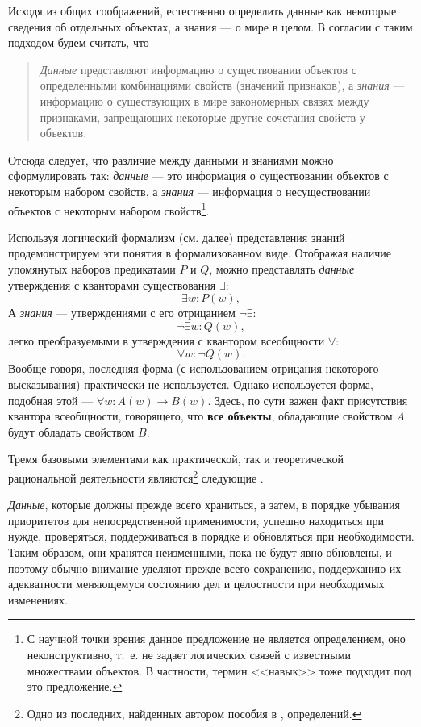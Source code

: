 \documentclass[12pt, openany, twoside]{book} %
\begin{document}
Исходя из общих соображений, естественно определить данные как некоторые сведения об отдельных объектах, а знания --- о мире в целом. В согласии с таким подходом будем считать, что
\begin{quote}
{\em Данные} представляют информацию о существовании объектов с определенными комбинациями свойств\linebreak{} (значений признаков), а {\em знания} --- информацию о существующих в мире закономерных связях между признаками, запрещающих некоторые другие сочетания свойств у объектов.
\end{quote}

Отсюда следует, что различие между данными и знаниями можно сфор\-му\-ли\-ро\-вать так: {\em данные} --- это информация о существовании объектов с некоторым набором свойств, а {\em знания} --- информация о несуществовании объектов с некоторым набором свойств\footnote{С научной точки зрения данное предложение не является определением, оно неконструктивно, т.~е. не задает логических связей с известными множествами объектов. В частности, термин <<навык>> тоже подходит под это предложение.}.

Используя логический формализм (см. далее) представления знаний продемонстрируем эти понятия в формализованном виде. Отображая наличие упомянутых наборов предикатами $P$ и $Q$, можно представлять {\em данные} утверждения с кванторами существования
$\exists$:
$$
    \exists w: P(w),
$$
А {\em знания} --- утверждениями с его отрицанием $\neg\exists$:
$$
    \neg\exists w: Q(w),
$$
легко преобразуемыми в утверждения с квантором всеобщности
$\forall$:
$$
    \forall w: \neg Q(w).
$$
Вообще говоря, последняя форма (с использованием отрицания некоторого высказывания) практически не используется. Однако используется форма, подобная этой --- $\forall w: A(w)\to B(w)$. Здесь, по сути важен факт присутствия квантора всеобщности, говорящего, что {\bf все объекты}, обладающие свойством $A$ будут обладать свойством $B$.

Тремя базовыми элементами как практической, так и теоретической рациональной деятельности являются\footnote{Одно из последних, найденных автором пособия в \cite{DDWII}, определений.} следующие \cite{DDWII}.

    {\em Данные}, которые должны прежде всего храниться, а затем, в порядке убывания приоритетов для непосредственной применимости, успешно находиться при нужде, проверяться, поддерживаться в порядке и обновляться при необходимости. Таким образом, они хранятся неизменными, пока не будут явно обновлены, и поэтому обычно внимание уделяют прежде всего сохранению, поддержанию их адекватности меняющемуся состоянию дел и целостности при необходимых изменениях.
\end{document}
